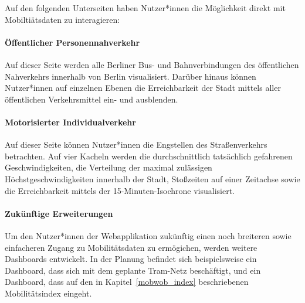 Auf den folgenden Unterseiten haben Nutzer*innen die Möglichkeit direkt mit Mobiltiätsdaten zu interagieren:

\paragraph{Öffentlicher Personennahverkehr}

Auf dieser Seite werden alle Berliner Bus- und Bahnverbindungen des öffentlichen Nahverkehrs innerhalb von Berlin visualisiert. Darüber hinaus können Nutzer*innen auf einzelnen Ebenen die Erreichbarkeit der Stadt mittels aller öffentlichen Verkehrsmittel ein- und ausblenden.

\paragraph{Motorisierter Individualverkehr}

Auf dieser Seite können Nutzer*innen die Engstellen des Straßenverkehrs betrachten. Auf vier Kacheln werden die durchschnittlich tatsächlich gefahrenen Geschwindigkeiten, die Verteilung der maximal zulässigen Höchstgeschwindigkeiten innerhalb der Stadt, Stoßzeiten auf einer Zeitachse sowie die Erreichbarkeit mittels der 15-Minuten-Isochrone visualisiert.

\paragraph{Zukünftige Erweiterungen}

Um den Nutzer*innen der Webapplikation zukünftig einen noch breiteren sowie einfacheren Zugang zu Mobilitätsdaten zu ermögichen, werden weitere Dashboards entwickelt. In der Planung befindet sich beispielsweise ein Dashboard, dass sich mit dem geplante Tram-Netz beschäftigt, und ein Dashboard, dass auf den in Kapitel~\ref{mobwob_index} beschriebenen Mobilitätsindex eingeht.
